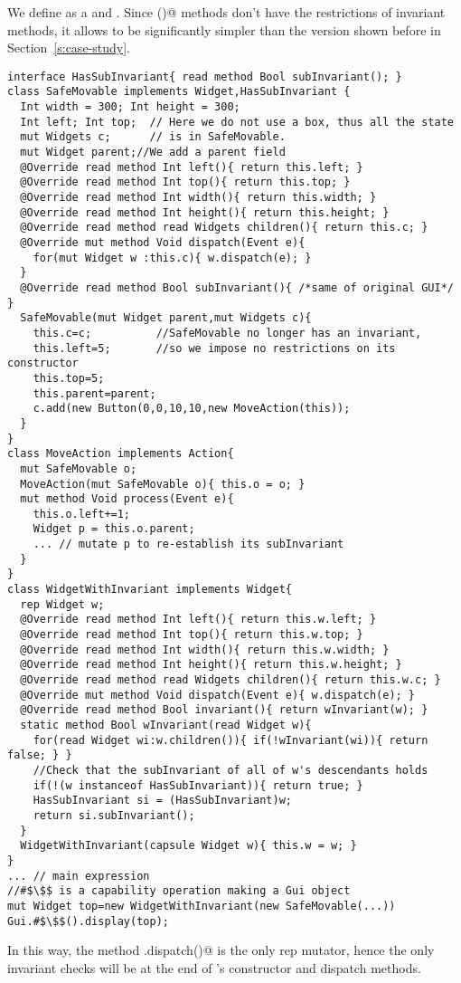 We define \Q@SafeMovable@ as a \Q@Widget@ and \Q@HasSubInvariant@. Since \Q@subInvariant()@ methods don't have the restrictions of invariant methods, it allows \Q@SafeMovable@ to be significantly simpler than the version shown before in Section~\ref{s:case-study}.
\begin{lstlisting}
interface HasSubInvariant{ read method Bool subInvariant(); }
class SafeMovable implements Widget,HasSubInvariant {
  Int width = 300; Int height = 300;
  Int left; Int top;  // Here we do not use a box, thus all the state
  mut Widgets c;      // is in SafeMovable.
  mut Widget parent;//We add a parent field
  @Override read method Int left(){ return this.left; }
  @Override read method Int top(){ return this.top; }
  @Override read method Int width(){ return this.width; }
  @Override read method Int height(){ return this.height; }
  @Override read method read Widgets children(){ return this.c; }
  @Override mut method Void dispatch(Event e){
    for(mut Widget w :this.c){ w.dispatch(e); }
  }
  @Override read method Bool subInvariant(){ /*same of original GUI*/ }
  SafeMovable(mut Widget parent,mut Widgets c){
    this.c=c;          //SafeMovable no longer has an invariant,
    this.left=5;       //so we impose no restrictions on its constructor
    this.top=5;
    this.parent=parent;
    c.add(new Button(0,0,10,10,new MoveAction(this));
  }
}
class MoveAction implements Action{
  mut SafeMovable o;
  MoveAction(mut SafeMovable o){ this.o = o; }
  mut method Void process(Event e){
    this.o.left+=1;
    Widget p = this.o.parent;
    ... // mutate p to re-establish its subInvariant
  }
}
class WidgetWithInvariant implements Widget{
  rep Widget w;
  @Override read method Int left(){ return this.w.left; }
  @Override read method Int top(){ return this.w.top; }
  @Override read method Int width(){ return this.w.width; }
  @Override read method Int height(){ return this.w.height; }
  @Override read method read Widgets children(){ return this.w.c; }
  @Override mut method Void dispatch(Event e){ w.dispatch(e); }
  @Override read method Bool invariant(){ return wInvariant(w); }
  static method Bool wInvariant(read Widget w){
    for(read Widget wi:w.children()){ if(!wInvariant(wi)){ return false; } }
    //Check that the subInvariant of all of w's descendants holds
    if(!(w instanceof HasSubInvariant)){ return true; }
    HasSubInvariant si = (HasSubInvariant)w;
    return si.subInvariant();
  }
  WidgetWithInvariant(capsule Widget w){ this.w = w; }
}
... // main expression
//#$\$$ is a capability operation making a Gui object
mut Widget top=new WidgetWithInvariant(new SafeMovable(...))
Gui.#$\$$().display(top);
\end{lstlisting}
In this way, the method \Q@WidgetWithInvariant.dispatch()@ is the only rep mutator, hence the only invariant checks will be at the end of \Q@WidgetWithInvariant@'s constructor and dispatch methods.

